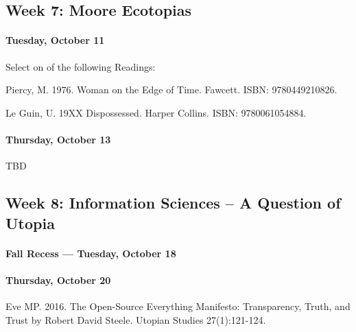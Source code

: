       
      
      \subsection{\textbf{Week 7:} Moore Ecotopias}
      
\paragraph{Tuesday, October 11}

Select on of the following Readings:

  \begin{itemize*}
      \item Piercy, M. 1976. Woman on the Edge of Time. Fawcett. ISBN: 9780449210826.
      \item Le Guin, U. 19XX Dispossessed. Harper Collins. ISBN: 9780061054884.
      \end{itemize*}
      

\paragraph{Thursday, October 13}
      
      \begin{itemize*}
      \item TBD			
      \end{itemize*}
    
      
      
      \subsection{\textbf{Week 8}: Information Sciences -- A Question of Utopia}
      
      \paragraph{Fall Recess --- Tuesday, October 18}
    
      
\paragraph{Thursday, October 20}
      
      \begin{itemize*}
      \item Eve MP. 2016. The Open-Source Everything Manifesto: Transparency, Truth, and Trust by Robert David Steele. Utopian Studies 27(1):121-124.					
      \end{itemize*}
      
